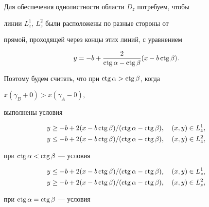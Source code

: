 {Для обеспечения однолистности области $D_{z}$ потребуем, чтобы


линии $L_{z}^{1}$, $L_{z}^{2}$ были расположены по разные стороны от


прямой, проходящей через концы этих линий, с уравнением


$$


y=-b+\frac{2}{\ctg \alpha -\ctg \beta}(x-b\ctg \beta).


$$


Поэтому будем считать, что при $\operatorname{ctg} \alpha >\operatorname{ctg} \beta$, когда


$x(\gamma_{B} +0) > x(\gamma_{A}-0)$,


выполнены условия




\begin{gather*}


y\geq -b+2(x-b\ctg \beta)/ (\ctg\alpha -\ctg \beta),


\quad (x,y)\in L_{z}^{1}, \\


y\leq -b+2(x-b\ctg \beta)/ (\ctg \alpha -\ctg \beta),


\quad (x,y)\in L_{z}^{2},


\end{gather*}




при $\operatorname{ctg} \alpha <\operatorname{ctg} \beta$ --- условия


\begin{equation}\label{14.5}


\begin{split}


y&\leq -b+2(x-b\ctg \beta)/ (\ctg \alpha -\ctg \beta),


\quad (x,y)\in L_{z}^{1}, \\


y&\geq -b+2(x-b\ctg \beta)/ (\ctg \alpha -\ctg \beta),


\quad (x,y)\in L_{z}^{2},


\end{split}


\end{equation}


при $\operatorname{ctg} \alpha =\operatorname{ctg} \beta$ --- условия


\begin{equation}\label{14.6}


\begin{split}



\end{split}
\end{equation}}

